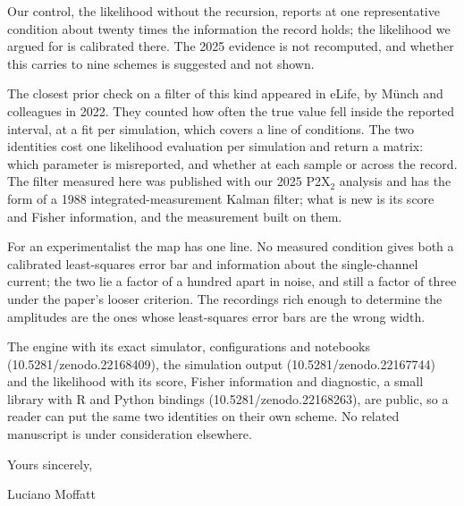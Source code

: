 \documentclass[10.5pt,a4paper]{article}
\begin{document}
Our control, the likelihood without the recursion, reports at one representative condition about
twenty times the information the record holds; the likelihood we argued for is calibrated there.
The 2025 evidence is not recomputed, and whether this carries to nine schemes is suggested and
not shown.

The closest prior check on a filter of this kind appeared in eLife, by M\"unch and colleagues in
2022. They counted how often the true value fell inside the reported interval, at a fit per
simulation, which covers a line of conditions. The two identities cost one likelihood evaluation
per simulation and return a matrix: which parameter is misreported, and whether at each sample or
across the record. The filter measured here was published
with our 2025 P2X$_2$ analysis and has the form of
a 1988 integrated-measurement Kalman filter; what is new is its score and Fisher information, and
the measurement built on them.

For an experimentalist the map has one line. No measured condition gives both a calibrated
least-squares error bar and information about the single-channel current; the two lie a factor of
a hundred apart in noise, and still a factor of three under the paper's looser criterion. The
recordings rich enough to determine the amplitudes are the ones whose least-squares error bars
are the wrong width.

The engine with its exact simulator, configurations and notebooks (10.5281/zenodo.22168409), the
simulation output (10.5281/zenodo.22167744) and the likelihood with its score, Fisher information
and diagnostic, a small library with R and Python bindings (10.5281/zenodo.22168263), are public,
so a reader can put the same two identities on their own scheme. No related manuscript is under
consideration elsewhere.

Yours sincerely,

\vspace{1.5em}

Luciano Moffatt
\end{document}
